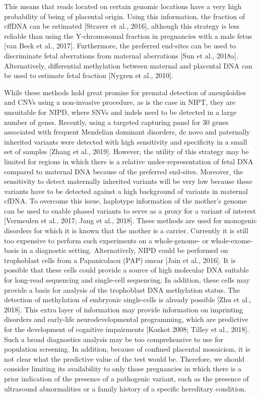 {This means that reads located on certain genomic locations have a very high probability of being of placental origin. 
Using this information, the fraction of cffDNA can be estimated [Straver et al., 2016], although this strategy is less reliable than using the Y-chromosomal fraction in pregnancies with a male fetus [van Beek et al., 2017]. 
Furthermore, the preferred end-sites can be used to discriminate fetal aberrations from maternal aberrations [Sun et al., 2018a]. 
Alternatively, differential methylation between maternal and placental DNA can be used to estimate fetal fraction [Nygren et al., 2010].

While these methods hold great promise for prenatal detection of aneuploidies and CNVs using a non-invasive procedure, as is the case in NIPT, they are unsuitable for NIPD, where SNVs and indels need to be detected in a large number of genes. Recently, using a targeted capturing panel for 30 genes associated with frequent Mendelian dominant disorders, de novo and paternally inherited variants were detected with high sensitivity and specificity in a small set of samples [Zhang et al., 2019]. 
However, the utility of this strategy may be limited for regions in which there is a relative under-representation of fetal DNA compared to maternal DNA because of the preferred end-sites.
Moreover, the sensitivity to detect maternally inherited variants will be very low because these variants have to be detected against a high background of variants in maternal cfDNA. 
To overcome this issue, haplotype information of the mother’s genome can be used to enable phased variants to serve as a proxy for a variant of interest [Vermeulen et al., 2017; Jang et al., 2018]. 
These methods are used for monogenic disorders for which it is known that the mother is a carrier. 
Currently it is still too expensive to perform such experiments on a whole-genome- or whole-exome-basis in a diagnostic setting. 
Alternatively, NIPD could be performed on trophoblast cells from a Papanicolaou (PAP) smear [Jain et al., 2016]. 
It is possible that these cells could provide a source of high molecular DNA suitable for long-read sequencing and single-cell sequencing. 
In addition, these cells may provide a basis for analysis of the trophoblast DNA methylation status. 
The detection of methylation of embryonic single-cells is already possible [Zhu et al., 2018]. 
This extra layer of information may provide information on imprinting disorders and early-life neurodevelopmental programming, which are predictive for the development of cognitive impairments [Kozkot 2008; Tilley et al., 2018]. 
Such a broad diagnostics analysis may be too comprehensive to use for population screening. 
In addition, because of confined placental mosaicism, it is not clear what the predictive value of the test would be. 
Therefore, we should consider limiting its availability to only those pregnancies in which there is a prior indication of the presence of a pathogenic variant, such as the presence of ultrasound abnormalities or a family history of a specific hereditary condition. 

}

